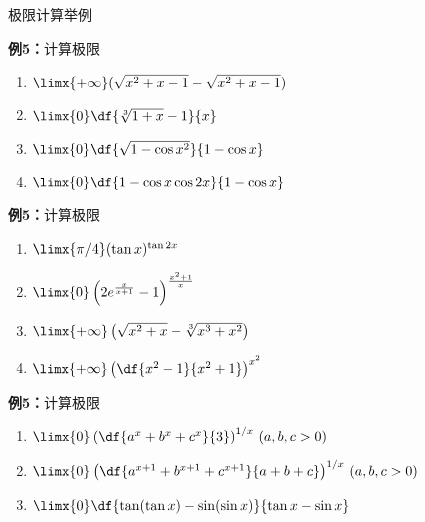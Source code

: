 
\begin{frame}{极限计算举例}
	\linespread{2}
	\begin{exampleblock}{{\bf 例5：}计算极限\hfill}\pause 
		\begin{enumerate}
		  \item $\limx{+\infty}(\sqrt{x^2+x-1}-\sqrt{x^2+x-1})$\pause 
		  \item $\limx{0}\df{\sqrt[3]{1+x}-1}{x}$\pause 
		  \item $\limx{0}\df{\sqrt{1-\cos x^2}}{1-\cos x}$\pause 
		  \item $\limx{0}\df{1-\cos x\cos 2x}{1-\cos x}$
		\end{enumerate}
	\end{exampleblock}
\end{frame}

\begin{frame}
	\linespread{2}
	\begin{exampleblock}{{\bf 例5：}计算极限\hfill}\pause 
		\begin{enumerate}
		  \addtocounter{enumi}{4}
		  \item $\limx{\pi /4}(\tan x)^{\tan 2x}$\pause 
		  \item $\limx{0}\left(2e^{\frac{x}{x+1}}-1\right)^{\frac{x^2+1}{x}}$\pause 
		  \item $\limx{+\infty}\left(\sqrt{x^2+x}-\sqrt[3]{x^3+x^2}\right)$\pause 
		  \item $\limx{+\infty}\left(\df{x^2-1}{x^2+1}\right)^{x^2}$
		\end{enumerate}
	\end{exampleblock}
\end{frame}

\begin{frame}
	\linespread{2.5}
	\begin{exampleblock}{{\bf 例5：}计算极限\hfill}\pause 
		\begin{enumerate}
		  \addtocounter{enumi}{8}
		  \item $\limx{0}\left(\df{a^x+b^x+c^x}{3}\right)^{1/x}\,(a,b,c>0)$\pause 
		  \item $\limx{0}\left(\df{a^{x+1}+b^{x+1}+c^{x+1}}{a+b+c}\right)^{1/x}
		  \,(a,b,c>0)$\pause 
		  \item $\limx{0}\df{\tan(\tan x)-\sin(\sin x)}{\tan x-\sin x}$
		\end{enumerate}
	\end{exampleblock}
\end{frame}